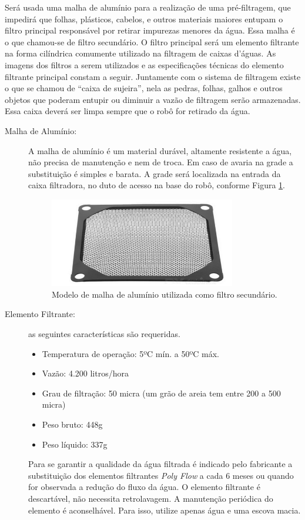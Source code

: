 Será usada uma malha de alumínio para a realização de uma pré-filtragem, que impedirá que folhas, plásticos, cabelos, e outros materiais maiores entupam o filtro principal responsável por retirar impurezas menores da água. Essa malha é o que chamou-se de filtro secundário. O filtro principal será um elemento filtrante na forma cilíndrica comumente utilizado na filtragem de caixas d’águas. As imagens dos filtros a serem utilizados e as especificações técnicas do elemento filtrante principal constam a seguir. Juntamente com o sistema de filtragem existe o que se chamou de “caixa de sujeira”, nela as pedras, folhas, galhos e outros objetos que poderam entupir ou diminuir a vazão de filtragem serão armazenadas. Essa caixa deverá ser limpa sempre que o robô for retirado da água.
\begin{description}
\item[Malha de Alumínio:] A malha de alumínio é um material durável, altamente resistente a água, não precisa de manutenção e nem de troca. Em caso de avaria na grade a substituição é simples e barata. A grade será localizada na entrada da caixa filtradora, no duto de acesso na base do robô, conforme Figura \ref{fig:mesh-aluminium}.
\par
  \begin{figure}[h]
    \centering
    \includegraphics[width=0.8\textwidth]{figures/mesh-aluminium.png}
    \caption{Modelo de malha de alumínio utilizada como filtro secundário.}
    \label{fig:mesh-aluminium}
  \end{figure}
  \FloatBarrier
\par
\item[Elemento Filtrante:] as seguintes características são requeridas.

\begin{itemize}
\item Temperatura de operação: 5ºC mín. a 50ºC máx.
\item Vazão: 4.200 litros/hora
\item Grau de filtração: 50 micra (um grão de areia tem entre 200 a 500 micra)
\item Peso bruto: 448g
\item Peso líquido: 337g
\end{itemize}
Para se garantir a qualidade da água filtrada é indicado pelo fabricante a substituição dos elementos filtrantes \textit{Poly Flow} a cada 6 meses ou quando for observada a redução do fluxo da água. O elemento filtrante é descartável, não necessita retrolavagem. A manutenção periódica do elemento é aconselhável. Para isso, utilize apenas água e uma escova macia.


\end{description}
